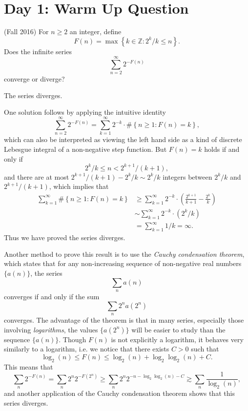 \documentclass[answers]{exam}
\theoremstyle{problemstyle}
\newcommand{\1}[1]{\textbf{1}_{\left[#1\right]}} %
\def\Z{\mathbb{Z}} %
\begin{document}
\newpage

\section*{Day 1: Warm Up Question}

\begin{questions}

\question (Fall 2016)
  For $n \geq 2$ an integer, define
  \[ F(n)= \max \left\{ k\in \Z: 2^{k}/k\leq n \right\}. \]
  Does the infinite series
  \[ \sum_{n=2}^{\infty}2^{-F(n)} \]
  converge or diverge?
\begin{solution}
	The series diverges.

	One solution follows by applying the intuitive identity
	\[ \sum_{n = 2}^\infty 2^{-F(n)} = \sum_{k = 1}^\infty 2^{-k} \cdot \# \left\{ n \geq 1 : F(n) = k \right\}, \]
	which can also be interpreted as viewing the left hand side as a kind of discrete Lebesgue integral of a non-negative step function. But $F(n) = k$ holds if and only if
	\[ 2^k/k \leq n < 2^{k+1} / (k+1), \]
	and there are at most $2^{k+1} / (k+1) - 2^k / k \sim 2^k / k$ integers between $2^k / k$ and $2^{k+1} / (k+1)$, which implies that
	\begin{align*}
		\sum_{k = 1}^\infty \# \left\{ n \geq 1: F(n) = k \right\} &\geq \sum_{k=1}^{\infty} 2^{-k} \cdot \left( \frac{2^{k+1}}{k+1}-\frac{2^{k}}{k} \right)\\
    &\sim \sum_{k=1}^{\infty} 2^{-k} \cdot (2^k / k)\\
    &=\sum_{k=1}^{\infty} 1/k = \infty.
  \end{align*}
  Thus we have proved the series diverges.

  Another method to prove this result is to use the \emph{Cauchy condensation theorem}, which states that for any non-increasing sequence of non-negative real numbers $\{ a(n) \}$, the series
	\[ \sum_n a(n) \]
	converges if and only if the sum
	\[ \sum_n 2^n a(2^n) \]
	converges. The advantage of the theorem is that in many series, especially those involving \emph{logarithms}, the values $\{ a(2^n) \}$ will be easier to study than the sequence $\{ a(n) \}$. Though $F(n)$ is not explicitly a logarithm, it behaves very similarly to a logarithm, i.e. we notice that there exists $C > 0$ such that
	\[ \log_2(n) \leq F(n) \leq \log_2(n) + \log_2 \log_2(n) + C. \]
	This means that
	\[ \sum_n 2^{-F(n)} = \sum_n 2^n 2^{-F(2^n)} \geq \sum_n 2^n 2^{- n - \log_2 \log_2(n) - C } \gtrsim \sum_n \frac{1}{\log_2(n)}, \]
	and another application of the Cauchy condensation theorem shows that this series diverges.
\end{solution}


\end{questions}
\end{document}
